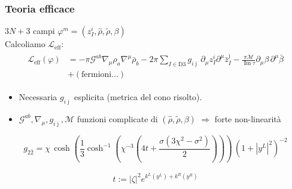 \documentclass[aspectratio=43,mathserif]{beamer}
\newcommand{\ssn}{\mathcal{N}}
\newcommand{\hatt}[1]{\ensuremath{\widehat{#1}}}
\newcommand{\tildd}[1]{\ensuremath{\widetilde{#1}}}
\renewcommand{\Im}{\ensuremath{\operatorname{Im}}}
\newcommand{\leff}{\ensuremath{\mathcal{L}_\text{eff}}}
\begin{document}
\begin{frame}
	\frametitle{Teoria efficace}
	$3N+3$ campi $\varphi^m = (z_I^i, \hatt\rho, \tildd\rho, \beta)$\\
	\vfill Calcoliamo $\leff$:
	\vspace{10pt}
	\begin{align}
		\begin{split}
			\leff(\varphi) &= - \pi \mathcal{G}^{ab} \nabla_\mu \rho_a \nabla^\mu \bar\rho_b - 2\pi \sum_{I\in \text{D3}} g_{i\bar\jmath}\, \partial_\mu z_I^i \partial^\mu \bar z_I^{\bar\jmath} - \frac{\pi\mathcal{M}}{\Im \tau} \partial_\mu \beta \,\partial^\mu \bar\beta\\
		&+ \left( \text{fermioni}\ldots \right)
	\end{split}
	\end{align}
	\vspace{-10pt}

	\begin{itemize}
		\item Necessaria $g_{i\bar\jmath}$ esplicita (metrica del cono risolto).
		\vfill \item $\mathcal{G}^{ab},\nabla_\mu,g_{i\bar\jmath},\mathcal{M}$ funzioni complicate di $(\hatt\rho,\tildd\rho,\beta)$ $\Longrightarrow$ forte non-linearità
	\end{itemize}



\end{frame}


\begin{frame}

	\begin{equation}
		g_{2\bar 2} = \chi \,\cosh\left( \frac{1}{3} \cosh^{-1} \left( \chi^{-3} \left( 4t + \frac{\sigma(3\chi^2-\sigma^2)}{2} \right) \right) \right) \, (1+ |y^L|^2)^{-2}
		\label{}
	\end{equation}

	\begin{align}
		t := |\zeta|^2 e^{k^L(y^L) + k^R(y^R)}
		\label{}
	\end{align}

\end{frame}
\end{document}
